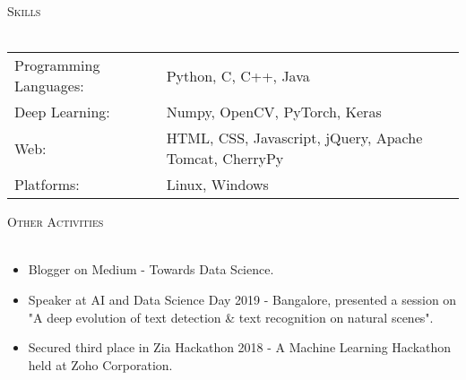 \documentclass[a4paper]{article}
\newcommand{\lineunder} {
    \vspace*{-8pt} \\
    \hspace*{-18pt} \hrulefill \\
}
\newcommand{\header} [1] {
    {\hspace*{-18pt}\vspace*{6pt} \textsc{#1}}
    \vspace*{-6pt} \lineunder
}
\begin{document}
\header{Skills}
\begin{tabular}{ l l }
    Programming Languages: & Python, C, C++, Java                                   \\
    Deep Learning:         & Numpy, OpenCV, PyTorch, Keras                          \\
    Web:                   & HTML, CSS, Javascript, jQuery, Apache Tomcat, CherryPy \\
    Platforms:             & Linux, Windows                                         \\
\end{tabular}
\vspace{2mm}

\header{Other Activities}
    \begin{itemize}
    \item Blogger on Medium - Towards Data Science.
    \item Speaker at AI and Data Science Day 2019 - Bangalore, presented a session on "A deep evolution of text detection \& text recognition on natural scenes".
    \item Secured third place in Zia Hackathon 2018 - A Machine Learning Hackathon held at Zoho Corporation.
    \end{itemize}

\vspace*{2mm}
\end{document}
